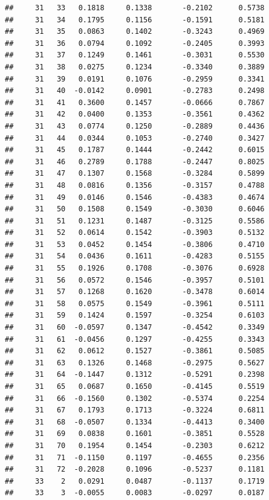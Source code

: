 \documentclass[
]{article}
\begin{document}
\begin{verbatim}
##     31   33   0.1818     0.1338       -0.2102      0.5738  
##     31   34   0.1795     0.1156       -0.1591      0.5181  
##     31   35   0.0863     0.1402       -0.3243      0.4969  
##     31   36   0.0794     0.1092       -0.2405      0.3993  
##     31   37   0.1249     0.1461       -0.3031      0.5530  
##     31   38   0.0275     0.1234       -0.3340      0.3889  
##     31   39   0.0191     0.1076       -0.2959      0.3341  
##     31   40  -0.0142     0.0901       -0.2783      0.2498  
##     31   41   0.3600     0.1457       -0.0666      0.7867  
##     31   42   0.0400     0.1353       -0.3561      0.4362  
##     31   43   0.0774     0.1250       -0.2889      0.4436  
##     31   44   0.0344     0.1053       -0.2740      0.3427  
##     31   45   0.1787     0.1444       -0.2442      0.6015  
##     31   46   0.2789     0.1788       -0.2447      0.8025  
##     31   47   0.1307     0.1568       -0.3284      0.5899  
##     31   48   0.0816     0.1356       -0.3157      0.4788  
##     31   49   0.0146     0.1546       -0.4383      0.4674  
##     31   50   0.1508     0.1549       -0.3030      0.6046  
##     31   51   0.1231     0.1487       -0.3125      0.5586  
##     31   52   0.0614     0.1542       -0.3903      0.5132  
##     31   53   0.0452     0.1454       -0.3806      0.4710  
##     31   54   0.0436     0.1611       -0.4283      0.5155  
##     31   55   0.1926     0.1708       -0.3076      0.6928  
##     31   56   0.0572     0.1546       -0.3957      0.5101  
##     31   57   0.1268     0.1620       -0.3478      0.6014  
##     31   58   0.0575     0.1549       -0.3961      0.5111  
##     31   59   0.1424     0.1597       -0.3254      0.6103  
##     31   60  -0.0597     0.1347       -0.4542      0.3349  
##     31   61  -0.0456     0.1297       -0.4255      0.3343  
##     31   62   0.0612     0.1527       -0.3861      0.5085  
##     31   63   0.1326     0.1468       -0.2975      0.5627  
##     31   64  -0.1447     0.1312       -0.5291      0.2398  
##     31   65   0.0687     0.1650       -0.4145      0.5519  
##     31   66  -0.1560     0.1302       -0.5374      0.2254  
##     31   67   0.1793     0.1713       -0.3224      0.6811  
##     31   68  -0.0507     0.1334       -0.4413      0.3400  
##     31   69   0.0838     0.1601       -0.3851      0.5528  
##     31   70   0.1954     0.1454       -0.2303      0.6212  
##     31   71  -0.1150     0.1197       -0.4655      0.2356  
##     31   72  -0.2028     0.1096       -0.5237      0.1181  
##     33    2   0.0291     0.0487       -0.1137      0.1719  
##     33    3  -0.0055     0.0083       -0.0297      0.0187  

\end{verbatim}
\end{document}
